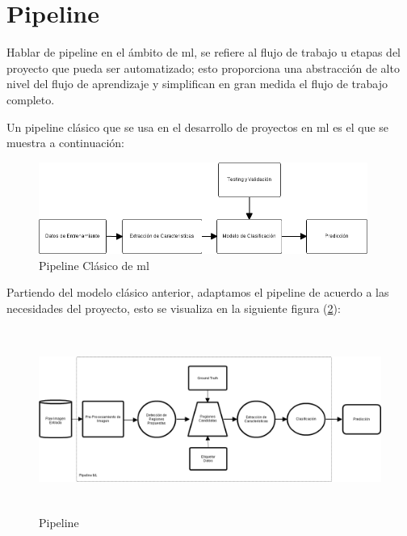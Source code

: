 \section{Pipeline}\label{sec:pipeline}
Hablar de pipeline en el ámbito de \ac{ml}, se refiere al flujo de trabajo u etapas del proyecto que pueda ser automatizado; esto proporciona una abstracción de alto nivel del flujo de aprendizaje y simplifican en gran medida el flujo de trabajo completo.

Un pipeline clásico que se usa en el desarrollo de proyectos en \ac{ml} es el que se muestra a continuación:
\begin{figure}[H]
 \centering
  \includegraphics[height=3cm,keepaspectratio=true,clip=true]{imagenes/Logos/pipelineclasico.png}
  \caption{Pipeline Clásico de \ac{ml}}
	\label{Fig: pipelineclasico}
\end{figure}

Partiendo del modelo clásico anterior, adaptamos el pipeline de acuerdo a las necesidades del proyecto, esto se visualiza en la siguiente figura (\ref{Fig: pipeline}):

\begin{figure}[H]
 \centering
  \includegraphics[height=6cm,keepaspectratio=true,clip=true]{imagenes/Logos/pipeline.png}
  \caption{Pipeline}
	\label{Fig: pipeline}
\end{figure}

